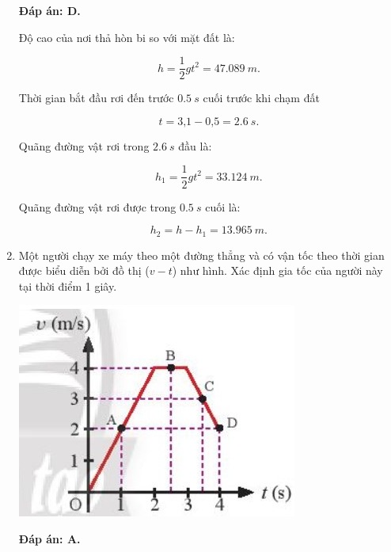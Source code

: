 \begin{enumerate}[label=\bfseries Câu \arabic*:]
{	}
	
	\hideall
	{\textbf{Đáp án: D.}
		
		Độ cao của nơi thả hòn bi so với mặt đất là:
		
		$$ h = \dfrac{1}{2}gt^2 = \SI{47,089}{m}.$$
		
		
		Thời gian bắt đầu rơi đến trước $\SI{0,5}{s}$ cuối trước khi chạm đất
		
		$$ t = \text{3,1} - \text{0,5} = \SI{2,6}{s}.$$ 
		
		Quãng đường vật rơi trong $\SI{2,6}{s}$ đầu là:
		
		$$h_1 = \dfrac{1}{2} gt^2 = \SI{33,124}{m}.$$
		
		Quãng đường vật rơi được trong $\SI{0,5}{s}$ cuối là: 
		
		$$h_2 = h - h_1 = \SI{13,965}{m}.$$
	
	}
	\item {}
	
	
	{Một người chạy xe máy theo một đường thẳng và có vận tốc theo thời gian được biểu diễn bởi đồ thị  ($v - t$) như hình. Xác định gia tốc của người này tại thời điểm 1 giây.
		
		\begin{center}
			\includegraphics[scale=0.6]{../figs/VN10-2022-PH-TP0001-7.jpg}
		\end{center}

		
	}
	
	\hideall
	{\textbf{Đáp án: A.}
		
}
\end{enumerate}
